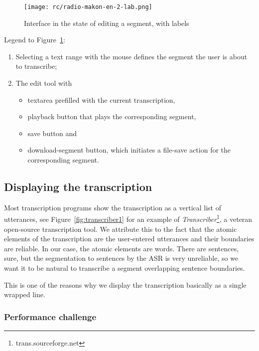\documentclass{llncs}
\begin{document}
\begin{figure}[htpb]
\texttt{[image: rc/radio-makon-en-2-lab.png]}
\caption{Interface in the state of editing a segment, with labels}
\label{fig:scn2lab}
\end{figure}

Legend to Figure~\ref{fig:scn2lab}:
\begin{enumerate}
\item{
    Selecting a text range with the mouse defines the segment the user is about
    to transcribe;
}
\item{
    The edit tool with
    \begin{itemize}
    \item{textarea prefilled with the current transcription,}
    \item{playback button that plays the corresponding segment,}
    \item{save button and}
    \item{download-segment button, which initiates a file-save action for the
    corresponding segment.}
    \end{itemize}
}
\end{enumerate}

\subsection{Displaying the transcription}

Most transcription programs show the transcription as a vertical list of
utterances, see Figure~\ref{fig:transcriber1} for an example of
{\em{Transcriber}}\footnote{trans.sourceforge.net}, a veteran open-source
transcription tool. We attribute this to the fact that the atomic elements of
the transcription are the user-entered utterances and their boundaries are
reliable. In our case, the atomic elements are words. There are sentences, sure,
but the segmentation to sentences by the ASR is very unreliable, so we want it
to be natural to transcribe a segment overlapping sentence boundaries.

This is one of the reasons why we display the transcription basically as a
single wrapped line.

\subsubsection{Performance challenge}
\end{document}
